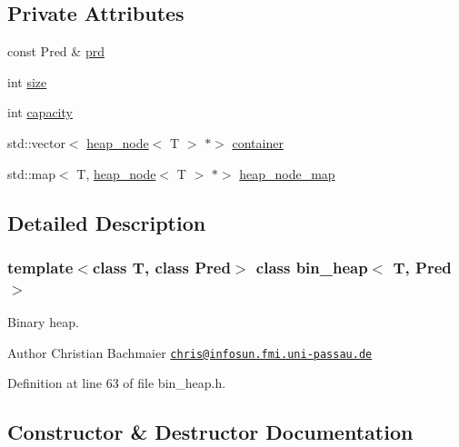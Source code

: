 \subsection*{Private Attributes}
\begin{DoxyCompactItemize}
\item 
const Pred \& \mbox{\hyperlink{classbin__heap_a5ecc420dfd03a6a0b4c9328cac1fae14}{prd}}
\item 
int \mbox{\hyperlink{classbin__heap_a8dde1008dcc24d734dbdb2c7ca50435b}{size}}
\item 
int \mbox{\hyperlink{classbin__heap_ac5aa6948898bfc047cae2fe99ba28f57}{capacity}}
\item 
std\+::vector$<$ \mbox{\hyperlink{classheap__node}{heap\+\_\+node}}$<$ T $>$ $\ast$$>$ \mbox{\hyperlink{classbin__heap_a413200f4c6e24090c5e9a32184fc8857}{container}}
\item 
std\+::map$<$ T, \mbox{\hyperlink{classheap__node}{heap\+\_\+node}}$<$ T $>$ $\ast$$>$ \mbox{\hyperlink{classbin__heap_ab646175f97b352ca26587d23bf57c79f}{heap\+\_\+node\+\_\+map}}
\end{DoxyCompactItemize}


\subsection{Detailed Description}
\subsubsection*{template$<$class T, class Pred$>$\newline
class bin\+\_\+heap$<$ T, Pred $>$}

Binary heap. 

\begin{DoxyAuthor}{Author}
Christian Bachmaier \href{mailto:chris@infosun.fmi.uni-passau.de}{\tt chris@infosun.\+fmi.\+uni-\/passau.\+de} 
\end{DoxyAuthor}


Definition at line 63 of file bin\+\_\+heap.\+h.



\subsection{Constructor \& Destructor Documentation}
\mbox{\label{classbin__heap_a9de42b60fac4b0d38aa738522eb7c4cd}} 

